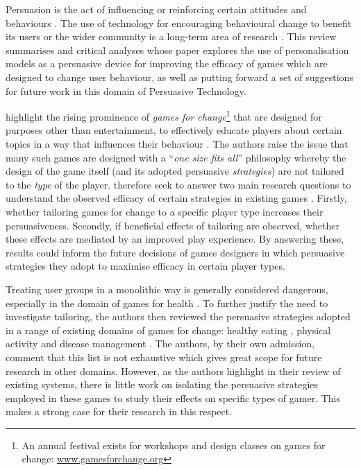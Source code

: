 \documentclass[11pt]{article}
\begin{document}

Persuasion is the act of influencing or reinforcing certain attitudes and behaviours \citep{khaled2008}. The use of technology for encouraging behavioural change to benefit its users or the wider community is a long-term area of research \citep{fogg2002}. This review summarises and critical analyses \citet{orji2017} whose paper explores the use of personalisation models as a persuasive device for improving the efficacy of games which are designed to change user behaviour, as well as putting forward a set of suggestions for future work in this domain of Persuasive Technology.

\citet{orji2017} highlight the rising prominence of \textit{games for change}\footnote{An annual festival exists for workshops and design classes on games for change: \url{www.gamesforchange.org}} that are designed for purposes other than entertainment, to effectively educate players about certain topics in a way that influences their behaviour \citep{busch2015}.  The authors raise the issue that many such games are designed with a ``\textit{one size fits all}'' philosophy whereby the design of the game itself (and its adopted persuasive \textit{strategies}) are not tailored to the \textit{type} of the player. \citet{orji2017} therefore seek to answer two main research questions to understand the observed efficacy of certain strategies in existing games \citep{peng2009,kaipainen2012}. Firstly, whether tailoring games for change to a specific player type increases their persuasiveness. Secondly, if beneficial effects of tailoring are observed, whether these effects are mediated by an improved play experience. By answering these, results could inform the future decisions of games designers in which persuasive strategies they adopt to maximise efficacy in certain player types. 

Treating user groups in a monolithic way is generally considered dangerous, especially in the domain of games for health \citep{berkovsky2010}.  To further justify the need to investigate tailoring, the authors then reviewed the persuasive strategies adopted in a range of existing domains of games for change: healthy eating \citep{kaipainen2012, orji2013b}, physical activity \citep{fujiki2008} and disease management \citep{brownson2007}. The authors, by their own admission, comment that this list is not exhaustive which gives great scope for future research in other domains. However, as the authors highlight in their review of existing systems, there is little work on isolating the persuasive strategies employed in these games to study their effects on specific types of gamer. This makes a strong case for their research in this respect.
\end{document}
